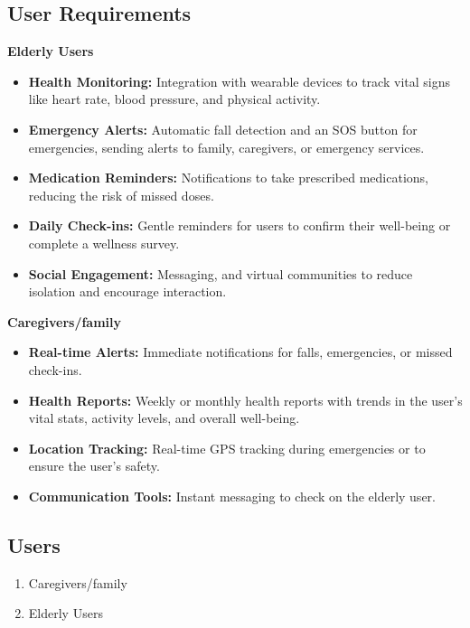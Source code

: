 \documentclass[a4paper, 12pt]{article}
\begin{document}
\subsection{User Requirements}

\textbf{\large Elderly Users} 
\begin{itemize}
    \item \textbf{Health Monitoring:} Integration with wearable devices to track vital signs like heart rate, blood pressure, and physical activity. 
    \item \textbf{Emergency Alerts:} Automatic fall detection and an SOS button for emergencies, sending alerts to family, caregivers, or emergency services.
    \item \textbf{Medication Reminders:} Notifications to take prescribed medications, reducing the risk of missed doses. 
    \item \textbf{Daily Check-ins:} Gentle reminders for users to confirm their well-being or complete a wellness survey.
    \item \textbf{Social Engagement:} Messaging, and virtual communities to reduce isolation and encourage interaction.
\end{itemize}
\textbf{\large Caregivers/family} 
\begin{itemize}
    \item \textbf{Real-time Alerts:} Immediate notifications for falls, emergencies, or missed check-ins.
    \item \textbf{Health Reports:} Weekly or monthly health reports with trends in the user's vital stats, activity levels, and overall well-being.
    \item \textbf{Location Tracking:} Real-time GPS tracking during emergencies or to ensure the user's safety.
    \item \textbf{Communication Tools:} Instant messaging to check on the elderly user.
\end{itemize}

\subsection{ Users}
\begin{enumerate}
    \item Caregivers/family
    \item Elderly Users
\end{enumerate}
\end{document}
